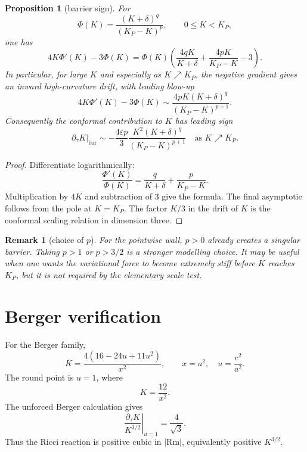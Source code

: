 \documentclass[11pt]{amsart}
\newtheorem{proposition}{Proposition}
\newtheorem{remark}{Remark}
\newcommand{\Rm}{\mathrm{Rm}}
\newcommand{\dt}{\partial_\tau}
\newcommand{\KP}{K_{\!P}}
\begin{document}
\begin{proposition}[barrier sign]
For
\[
        \Phi(K)=\frac{(K+\delta)^q}{(\KP-K)^p},
        \qquad 0\le K<\KP,
\]
one has
\[
        4K\Phi'(K)-3\Phi(K)
        =
        \Phi(K)
        \left(
             \frac{4qK}{K+\delta}
             +
             \frac{4pK}{\KP-K}
             -
             3
        \right).
\]
In particular, for large \(K\) and especially as \(K\nearrow\KP\), the
negative gradient gives an inward high-curvature drift, with leading blow-up
\[
        4K\Phi'(K)-3\Phi(K)
        \sim
        \frac{4pK(K+\delta)^q}{(\KP-K)^{p+1}}.
\]
Consequently the conformal contribution to \(K\) has leading sign
\[
        \dt K\big|_{\mathrm{bar}}
        \sim
        -
        \frac{4\varepsilon p}{3}
        \frac{K^2(K+\delta)^q}{(\KP-K)^{p+1}}
        \quad
        \text{as } K\nearrow\KP .
\]
\end{proposition}

\begin{proof}
Differentiate logarithmically:
\[
        \frac{\Phi'(K)}{\Phi(K)}
        =
        \frac{q}{K+\delta}
        +
        \frac{p}{\KP-K}.
\]
Multiplication by \(4K\) and subtraction of \(3\) give the formula.  The final
asymptotic follows from the pole at \(K=\KP\).  The factor \(K/3\) in the
drift of \(K\) is the conformal scaling relation in dimension three.
\end{proof}

\begin{remark}[choice of \(p\)]
For the pointwise wall, \(p>0\) already creates a singular barrier.  Taking
\(p>1\) or \(p>3/2\) is a stronger modelling choice.  It may be useful when one
wants the variational force to become extremely stiff before \(K\) reaches
\(\KP\), but it is not required by the elementary scale test.
\end{remark}

\section{Berger verification}

For the Berger family,
\[
        K=\frac{4(16-24u+11u^2)}{x^2},
        \qquad x=a^2,\quad u=\frac{c^2}{a^2}.
\]
The round point is \(u=1\), where
\[
        K=\frac{12}{x^2}.
\]
The unforced Berger calculation gives
\[
        \left.\frac{\dt K}{K^{3/2}}\right|_{u=1}
        =
        \frac{4}{\sqrt3}.
\]
Thus the Ricci reaction is positive cubic in \(|\Rm|\), equivalently
positive \(K^{3/2}\).
\end{document}
